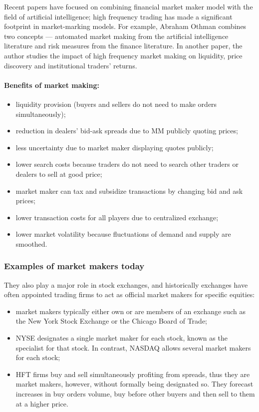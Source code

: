 \documentclass{article}
\begin{document}
\begin{multicols}{2}
Recent papers have focused on combining financial market maker model with the field of artificial intelligence; high frequency trading has made a significant footprint in market-marking models. For example, Abraham Othman combines two concepts — automated market making from the artificial intelligence literature and risk measures from the finance literature. In another paper, the author studies the impact of high frequency market making on liquidity, price discovery and institutional traders’ returns.

\paragraph*{Benefits of market making:}

\begin{itemize}
\item liquidity provision (buyers and sellers do not need to make orders simultaneously);
\item reduction in dealers' bid-ask spreads due to MM publicly quoting prices;
\item less uncertainty due to market maker displaying quotes publicly;
\item lower search costs because traders do not need to search other traders or dealers to sell at good price;
\item market maker can tax and subsidize transactions by changing bid and ask prices;
\item lower transaction costs for all players due to centralized exchange;
\item lower market volatility because fluctuations of demand and supply are smoothed.
\end{itemize}

\subsubsection*{Examples of market makers today}
 
They also play a major role in stock exchanges, and historically exchanges have often appointed trading firms to act as official market makers for specific equities:

\begin{itemize}
\item market makers typically either own or are members of an exchange such as the New York Stock Exchange or the Chicago Board of Trade;
\item NYSE designates a single market maker for each stock, known as the specialist for that stock. In contrast, NASDAQ allows several market makers for each stock;
\item HFT firms buy and sell simultaneously profiting from spreads, thus they are market makers, however, without formally being designated so. They forecast increases in buy orders volume, buy before other buyers and then sell to them at a higher price.
\end{itemize}


\end{multicols}
\end{document}
